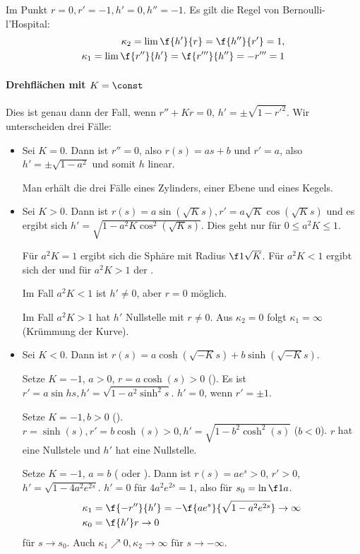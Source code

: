 Im Punkt $r = 0, r' = -1, h' = 0, h'' = -1$.
Es gilt die Regel von Bernoulli-l'Hospital:
\begin{align*}
	\kappa_2 = \lim \f{h'}{r} = \f{h''}{r'} = 1, \\
	\kappa_1 = \lim \f{r''}{h'} = \f{r'''}{h''} = -r''' = 1
\end{align*}

\paragraph{Drehflächen mit $K = \const$}

Dies ist genau dann der Fall, wenn $r'' + Kr = 0$, $h' = \pm \sqrt{1 - r'^2}$.
Wir unterscheiden drei Fälle:
\begin{itemize}
	\item
		Sei $K = 0$.
		Dann ist $r'' = 0$, also $r(s) = as + b$ und $r' = a$, also $h' = \pm \sqrt{1 - a^2}$ und somit $h$ linear.

		Man erhält die drei Fälle eines Zylinders, einer Ebene und eines Kegels.
	\item
		Sei $K > 0$.
		Dann ist $r(s) = a \sin(\sqrt K s), r' = a \sqrt{K} \cos (\sqrt K s)$ und es ergibt sich $h' = \sqrt{1 - a^2 K \cos^2(\sqrt K s)}$.
		Dies geht nur für $0 \le a^2 K \le 1$.

		Für $a^2 K = 1$ ergibt sich die Sphäre mit Radius $\f 1{\sqrt K}$.
		Für $a^2 K < 1$ ergibt sich der  und für $a^2 K > 1$ der .

		Im Fall $a^2 K < 1$ ist $h' \neq 0$, aber $r = 0$ möglich.

		Im Fall $a^2 K > 1$ hat $h'$ Nullstelle mit $r \neq 0$.
		Aus $\kappa_2 = 0$ folgt $\kappa_1 = \infty$ (Krümmung der Kurve).
	\item
		Sei $K < 0$.
		Dann ist $r(s) = a\cosh (\sqrt{-K} s) + b \sinh (\sqrt{-K} s)$.

		Setze $K = -1$, $a > 0$, $r = a \cosh (s) > 0$ ().
		Es ist $r' = a \sin h s, h' = \sqrt{1 - a^2 \sinh^2 s}$.
		$h' = 0$, wenn $r' = \pm 1$.

		Setze $K = - 1, b > 0$ ().
		$r = \sinh (s), r' = b \cosh (s) > 0, h' = \sqrt{1 - b^2 \cosh^2 (s)}$ ($b < 0$).
		$r$ hat eine Nullstele und $h'$ hat eine Nullstelle.

		Setze $K = -1$, $a = b$ ( oder ).
		Dann ist $r(s) = a e^s > 0$, $r' > 0$, $h' = \sqrt{1 - 4a^2 e^{2s}}$.
		$h' = 0$ für $4a^2 e^{2s} = 1$, also für $s_0 = \ln \f 1{a}$.
		\begin{align*}
			\kappa_1 &= \f {-r''}{h'} = - \f {ae^s}{\sqrt{1-a^2e^{2s}}} \to \infty \\
			\kappa_0 &= \f {h'}r \to 0
		\end{align*}
		für $s \to s_0$.
		Auch $\kappa_1 \nearrow 0, \kappa_2 \to \infty$ für $s \to -\infty$.
\end{itemize}


